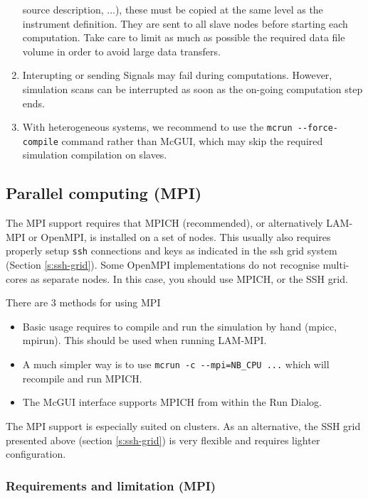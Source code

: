 \begin{enumerate}
{      source description, ...), these must be copied at the same level as the
      instrument definition. They are sent to all slave nodes before starting
      each computation.  Take care to limit as much as possible the required
      data file volume in order to avoid large data transfers.}
  \item Interupting or sending Signals may fail during computations. However,
  simulation scans can be interrupted as soon as the on-going computation
  step ends.
\item With heterogeneous systems, we recommend to use the
  \verb+mcrun --force-compile+ command rather than McGUI, which may skip the
  required simulation compilation on slaves.
  \end{enumerate}

\subsection{Parallel computing (MPI)}
\label{s:mpi}
The MPI support requires that MPICH (recommended), or alternatively LAM-MPI or
OpenMPI, is installed on a set of nodes. This usually also requires properly
setup \texttt{ssh} connections and keys as indicated in the ssh grid system
(Section \ref{s:ssh-grid}). Some OpenMPI implementations do not recognise
multi-cores as separate nodes. In this case, you should use MPICH, or the SSH
grid.

There are 3 methods for using MPI
\begin{itemize}
\item Basic usage requires to compile and run the simulation by hand (mpicc, mpirun).
  This should be used when running LAM-MPI.
\item A much simpler way is to use \verb+mcrun -c --mpi=NB_CPU ...+ which will
  recompile and run MPICH.
\item The McGUI interface supports MPICH from within the Run Dialog.
\end{itemize}

The MPI support is especially suited on clusters. As an alternative, the SSH
grid presented above (section \ref{s:ssh-grid}) is very flexible and requires
lighter configuration.

\subsubsection{Requirements and limitation (MPI)}

